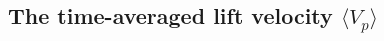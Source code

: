 \documentclass{jfm}
\begin{document}

\subsection{The time-averaged lift velocity $\langle V_p \rangle$} \label{sec:avglift_Calcn}
\end{document}
